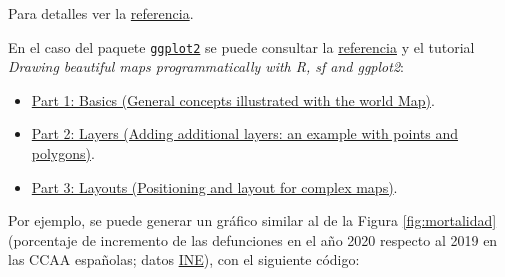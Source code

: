 \documentclass[
  spanish,
]{book}
\providecommand{\tightlist}{%
  \setlength{\itemsep}{0pt}\setlength{\parskip}{0pt}}
\theoremstyle{break}
\theoremstyle{definition}
\theoremstyle{definition}
\theoremstyle{definition}
\theoremstyle{definition}
\theoremstyle{remark}
\begin{document}
Para detalles ver la \href{https://r-spatial.github.io/sf/reference/tidyverse.html}{referencia}.

En el caso del paquete \href{https://ggplot2.tidyverse.org}{\texttt{ggplot2}} se puede consultar la \href{https://ggplot2.tidyverse.org/reference/ggsf.html}{referencia} y el tutorial \emph{Drawing beautiful maps programmatically with R, sf and ggplot2}:

\begin{itemize}
\tightlist
\item
  \href{https://r-spatial.org/r/2018/10/25/ggplot2-sf.html}{Part 1: Basics (General concepts illustrated with the world Map)}.
\item
  \href{https://r-spatial.org/r/2018/10/25/ggplot2-sf-2.html}{Part 2: Layers (Adding additional layers: an example with points and polygons)}.
\item
  \href{https://r-spatial.org/r/2018/10/25/ggplot2-sf-3.html}{Part 3: Layouts (Positioning and layout for complex maps)}.
\end{itemize}

Por ejemplo, se puede generar un gráfico similar al de la Figura \ref{fig:mortalidad} (porcentaje de incremento de las defunciones en el año 2020 respecto al 2019 en las CCAA españolas; datos \href{https://www.ine.es/jaxiT3/Tabla.htm?t=6546}{INE}), con el siguiente código:
\end{document}
